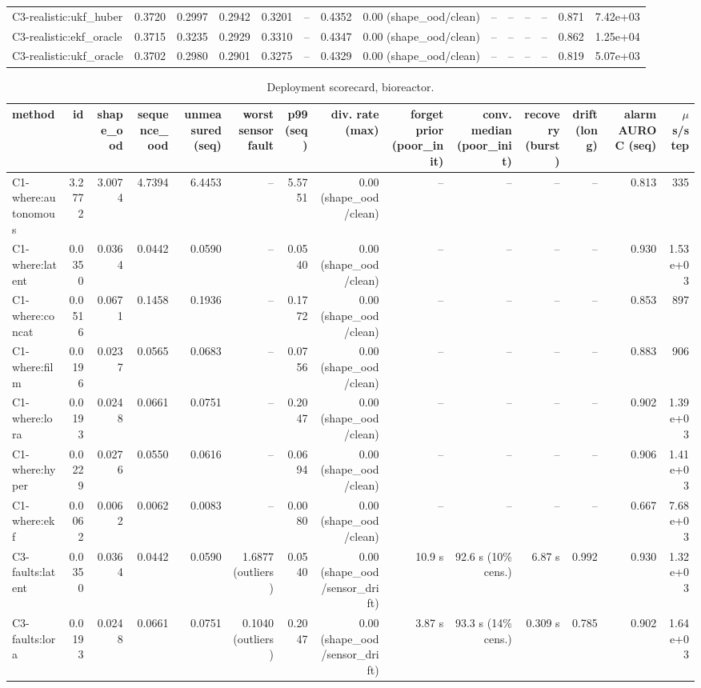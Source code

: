 \begin{table}[t]
\begin{tabular}{lrrrrrrrrrrrrr}
C3-realistic:ukf\_huber & 0.3720 & 0.2997 & 0.2942 & 0.3201 & – & 0.4352 & 0.00 (shape\_ood/clean) & – & – & – & – & 0.871 & 7.42e+03 \\
C3-realistic:ekf\_oracle & 0.3715 & 0.3235 & 0.2929 & 0.3310 & – & 0.4347 & 0.00 (shape\_ood/clean) & – & – & – & – & 0.862 & 1.25e+04 \\
C3-realistic:ukf\_oracle & 0.3702 & 0.2980 & 0.2901 & 0.3275 & – & 0.4329 & 0.00 (shape\_ood/clean) & – & – & – & – & 0.819 & 5.07e+03 \\
\bottomrule
\end{tabular}
\end{table}

\begin{table}[t]
\centering
\scriptsize
\caption{Deployment scorecard, bioreactor.}
\begin{tabular}{lrrrrrrrrrrrrr}
\toprule
method & id & shape\_ood & sequence\_ood & unmeasured (seq) & worst sensor fault & p99 (seq) & div. rate (max) & forget prior (poor\_init) & conv. median (poor\_init) & recovery (burst) & drift (long) & alarm AUROC (seq) & $\mu$s/step \\
\midrule
C1-where:autonomous & 3.2772 & 3.0074 & 4.7394 & 6.4453 & – & 5.5751 & 0.00 (shape\_ood/clean) & – & – & – & – & 0.813 & 335 \\
C1-where:latent & 0.0350 & 0.0364 & 0.0442 & 0.0590 & – & 0.0540 & 0.00 (shape\_ood/clean) & – & – & – & – & 0.930 & 1.53e+03 \\
C1-where:concat & 0.0516 & 0.0671 & 0.1458 & 0.1936 & – & 0.1772 & 0.00 (shape\_ood/clean) & – & – & – & – & 0.853 & 897 \\
C1-where:film & 0.0196 & 0.0237 & 0.0565 & 0.0683 & – & 0.0756 & 0.00 (shape\_ood/clean) & – & – & – & – & 0.883 & 906 \\
C1-where:lora & 0.0193 & 0.0248 & 0.0661 & 0.0751 & – & 0.2047 & 0.00 (shape\_ood/clean) & – & – & – & – & 0.902 & 1.39e+03 \\
C1-where:hyper & 0.0229 & 0.0276 & 0.0550 & 0.0616 & – & 0.0694 & 0.00 (shape\_ood/clean) & – & – & – & – & 0.906 & 1.41e+03 \\
C1-where:ekf & 0.0062 & 0.0062 & 0.0062 & 0.0083 & – & 0.0080 & 0.00 (shape\_ood/clean) & – & – & – & – & 0.667 & 7.68e+03 \\
C3-faults:latent & 0.0350 & 0.0364 & 0.0442 & 0.0590 & 1.6877 (outliers) & 0.0540 & 0.00 (shape\_ood/sensor\_drift) & 10.9 s & 92.6 s (10\% cens.) & 6.87 s & 0.992 & 0.930 & 1.32e+03 \\
C3-faults:lora & 0.0193 & 0.0248 & 0.0661 & 0.0751 & 0.1040 (outliers) & 0.2047 & 0.00 (shape\_ood/sensor\_drift) & 3.87 s & 93.3 s (14\% cens.) & 0.309 s & 0.785 & 0.902 & 1.64e+03 \\

\end{tabular}
\end{table}
